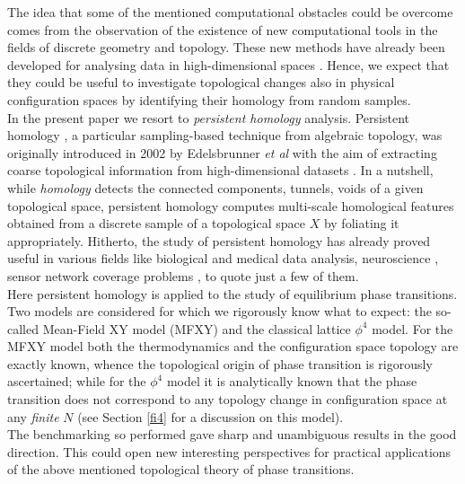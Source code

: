 \documentclass[preprintnumbers,showpacs, showkeys, twocolumn,secnumarabic,amssymb,amsmath,amsfonts,aps, pre]{revtex4-1}
\begin{document}
The idea that some of the mentioned computational obstacles could be overcome comes from the observation of the existence of new computational tools in the fields of discrete geometry and topology. These new methods have already been developed for analysing data in high-dimensional spaces \cite{Niyogi:2006}. Hence, we expect that they could be useful to investigate topological changes also in physical configuration spaces by identifying their homology from random samples.\\
In the present paper  we resort to \textit{persistent homology} analysis. 
Persistent homology \cite{Ghrist:2008tw,Pers,Top}, a particular sampling-based technique from algebraic topology, was originally  introduced in 2002 \cite{edels:2002} by Edelsbrunner {\it et al} with the aim of extracting coarse topological information from high-dimensional datasets \cite{Niyogi:2006}. 
In a nutshell, while \textit{homology} detects the connected components, tunnels, voids of a given topological space, persistent homology computes multi-scale homological features obtained from a discrete sample of a topological space $X$ by foliating it appropriately.  
Hitherto, the study of persistent homology has already proved useful in various fields like biological and medical data analysis, neuroscience \cite{Petri:2014hq}, sensor network coverage problems \cite{DeSilva:2007ve}, to quote just a few of them.\\
Here persistent homology is applied to the study of equilibrium phase transitions. Two models are considered for which we rigorously know what to expect: the so-called Mean-Field XY model (MFXY) and the classical lattice $\phi^4$ model. 
For the MFXY model both the thermodynamics and the configuration space topology are exactly known, whence the topological origin 
of phase transition is rigorously ascertained; while for the $\phi^4$ model it is analytically known that the phase transition does not correspond to any topology change in configuration space at any \textit{finite} $N$ (see Section \ref{fi4} for a discussion on this model). \\
The benchmarking so performed gave sharp and unambiguous results in the good direction. 
This could  open new interesting perspectives for practical applications of the above mentioned topological theory of phase transitions. 
\end{document}
